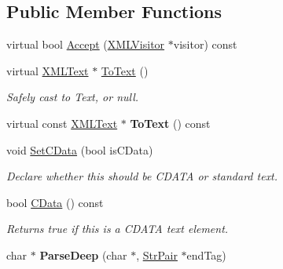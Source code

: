 \subsection*{Public Member Functions}
\begin{DoxyCompactItemize}
\item 
virtual bool \hyperlink{classtinyxml2_1_1_x_m_l_text_ae659d4fc7351a7df11c111cbe1ade46f}{Accept} (\hyperlink{classtinyxml2_1_1_x_m_l_visitor}{X\-M\-L\-Visitor} $\ast$visitor) const 
\item 
\hypertarget{classtinyxml2_1_1_x_m_l_text_ab1213b4ddebe9b17ec7e7040e9f1caf7}{virtual \hyperlink{classtinyxml2_1_1_x_m_l_text}{X\-M\-L\-Text} $\ast$ \hyperlink{classtinyxml2_1_1_x_m_l_text_ab1213b4ddebe9b17ec7e7040e9f1caf7}{To\-Text} ()}\label{classtinyxml2_1_1_x_m_l_text_ab1213b4ddebe9b17ec7e7040e9f1caf7}

\begin{DoxyCompactList}\small\item\em Safely cast to Text, or null. \end{DoxyCompactList}\item 
\hypertarget{classtinyxml2_1_1_x_m_l_text_a1e53cbc60968fe966790a65eaf87baaa}{virtual const \hyperlink{classtinyxml2_1_1_x_m_l_text}{X\-M\-L\-Text} $\ast$ {\bfseries To\-Text} () const }\label{classtinyxml2_1_1_x_m_l_text_a1e53cbc60968fe966790a65eaf87baaa}

\item 
\hypertarget{classtinyxml2_1_1_x_m_l_text_ad080357d76ab7cc59d7651249949329d}{void \hyperlink{classtinyxml2_1_1_x_m_l_text_ad080357d76ab7cc59d7651249949329d}{Set\-C\-Data} (bool is\-C\-Data)}\label{classtinyxml2_1_1_x_m_l_text_ad080357d76ab7cc59d7651249949329d}

\begin{DoxyCompactList}\small\item\em Declare whether this should be C\-D\-A\-T\-A or standard text. \end{DoxyCompactList}\item 
\hypertarget{classtinyxml2_1_1_x_m_l_text_a125574fe49da80efbae1349f20d02d41}{bool \hyperlink{classtinyxml2_1_1_x_m_l_text_a125574fe49da80efbae1349f20d02d41}{C\-Data} () const }\label{classtinyxml2_1_1_x_m_l_text_a125574fe49da80efbae1349f20d02d41}

\begin{DoxyCompactList}\small\item\em Returns true if this is a C\-D\-A\-T\-A text element. \end{DoxyCompactList}\item 
\hypertarget{classtinyxml2_1_1_x_m_l_text_ac18d9eec9f12b827b0d02b0847bf279e}{char $\ast$ {\bfseries Parse\-Deep} (char $\ast$, \hyperlink{classtinyxml2_1_1_str_pair}{Str\-Pair} $\ast$end\-Tag)}\label{classtinyxml2_1_1_x_m_l_text_ac18d9eec9f12b827b0d02b0847bf279e}


\end{DoxyCompactItemize}
